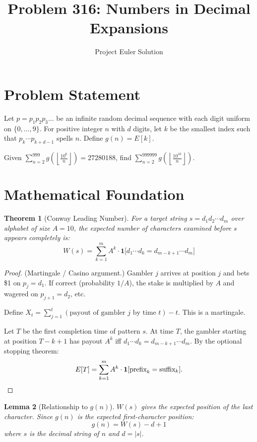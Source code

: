 \documentclass[12pt]{article}
\title{Problem 316: Numbers in Decimal Expansions}
\author{Project Euler Solution}
\date{}
\newtheorem{theorem}{Theorem}
\newtheorem{lemma}[theorem]{Lemma}
\begin{document}
\maketitle

\section{Problem Statement}

Let $p = p_1 p_2 p_3 \ldots$ be an infinite random decimal sequence with each digit uniform on $\{0,\ldots,9\}$. For positive integer $n$ with $d$ digits, let $k$ be the smallest index such that $p_k \cdots p_{k+d-1}$ spells $n$. Define $g(n) = E[k]$.

Given $\displaystyle\sum_{n=2}^{999} g\!\left(\!\left\lfloor \frac{10^6}{n}\right\rfloor\!\right) = 27280188$, find $\displaystyle\sum_{n=2}^{999999} g\!\left(\!\left\lfloor \frac{10^{16}}{n}\right\rfloor\!\right)$.

\section{Mathematical Foundation}

\begin{theorem}[Conway Leading Number]
For a target string $s = d_1 d_2 \cdots d_m$ over alphabet of size $A = 10$, the expected number of characters examined before $s$ appears completely is:
\[
    W(s) = \sum_{k=1}^{m} A^k \cdot \mathbf{1}\bigl[d_1 \cdots d_k = d_{m-k+1} \cdots d_m\bigr]
\]
\end{theorem}

\begin{proof}
(Martingale / Casino argument.) Gambler $j$ arrives at position $j$ and bets \$1 on $p_j = d_1$. If correct (probability $1/A$), the stake is multiplied by $A$ and wagered on $p_{j+1} = d_2$, etc.

Define $X_t = \sum_{j=1}^{t}(\text{payout of gambler }j\text{ by time }t) - t$. This is a martingale.

Let $T$ be the first completion time of pattern $s$. At time $T$, the gambler starting at position $T-k+1$ has payout $A^k$ iff $d_1\cdots d_k = d_{m-k+1}\cdots d_m$. By the optional stopping theorem:
\[
    E[T] = \sum_{k=1}^{m} A^k \cdot \mathbf{1}[\text{prefix}_k = \text{suffix}_k]. \qedhere
\]
\end{proof}

\begin{lemma}[Relationship to $g(n)$]
$W(s)$ gives the expected position of the last character. Since $g(n)$ is the expected first-character position:
\[
    g(n) = W(s) - d + 1
\]
where $s$ is the decimal string of $n$ and $d = |s|$.
\end{lemma}
\end{document}
